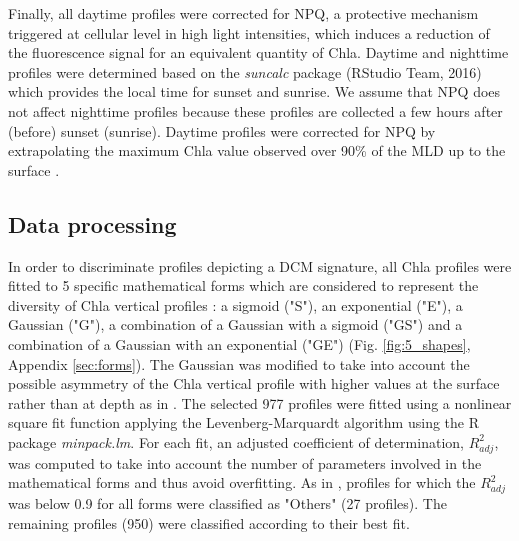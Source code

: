 \documentclass[journal abbreviation, manuscript]{copernicus}
\begin{document}
Finally, all daytime profiles were corrected for NPQ, a protective mechanism triggered at cellular level in high light intensities, which induces a reduction of the fluorescence signal for an equivalent quantity of Chla.   
Daytime and nighttime profiles were determined based on the \textit{suncalc} package (RStudio Team, 2016) which provides the local time for sunset and sunrise.
We assume that NPQ does not affect nighttime profiles because these profiles are collected a few hours after (before) sunset (sunrise).
Daytime profiles were corrected for NPQ by extrapolating the maximum Chla value observed over 90\% of the MLD up to the surface \citep{Schmechtig2018}. 

\subsection{Data processing}

In order to discriminate profiles depicting a DCM signature, all Chla profiles were fitted to 5 specific mathematical forms which are considered to represent the diversity of Chla vertical profiles \citep{Mignot2011, carranza2018}: a sigmoid ("S"), an exponential ("E"), a Gaussian ("G"), a combination of a Gaussian with a sigmoid ("GS") and a combination of a Gaussian with an exponential ("GE") (Fig. \ref{fig:5_shapes}, Appendix \ref{sec:forms}).
The Gaussian was modified to take into account the possible asymmetry of the Chla vertical profile with higher values at the surface rather than at depth as in \citet{Mignot2011}.
The selected 977 profiles were fitted using a nonlinear square fit function applying the Levenberg-Marquardt algorithm \citep{levenberg1978} using the R package \textit{minpack.lm}.
For each fit, an adjusted coefficient of determination, $R^2_{adj}$, was computed to take into account the number of parameters involved in the mathematical forms and thus avoid overfitting.
As in \citet{Mignot2011}, profiles for which the $R^2_{adj}$ was below 0.9 for all forms were classified as "Others" (27 profiles). The remaining profiles (950) were classified according to their best fit.

\end{document}
